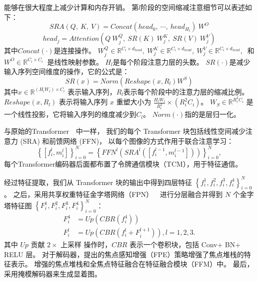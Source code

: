 能够在很大程度上减少计算和内存开销。
第$l$阶段的空间缩减注意细节可以表述如下：
%
%
%
%
\begin{equation}
	SRA(Q,~K,~V) = Concat(head_{0},~ \cdots,~ head_{H_{l}})~W^{O}
\end{equation}
%
%
\begin{equation}
	head_{j} = Attention(Q~W_{j}^{Q}, ~ SR(K)~W_{j}^{K},~ SR(V)~W_{j}^{V})
\end{equation}
%
%
%
其中$Concat(\cdot)$是连接操作。
$W_{j}^{Q} \in \mathbb{R}^{C_{i} \times d_{head}},~
W_{j}^{K} \in \mathbb{R}^{C_{i} \times d_{head}},~
W_{j}^{V} \in \mathbb{R}^{C_{i} \times d_{head}},~$
和
$W^{O} \in \mathbb{R}^{C_{i} \times C_{i}}~$
是线性映射参数。
$H_{l}$是每个阶段注意力层的头数。
$SR(\cdot)$是减少输入序列空间维度的操作，它的公式是：
%
%
%
\begin{equation}
	SR(x) = Norm(Reshape(x, R_{l})W^{S})
\end{equation}
%
%
其中$x \in \mathbb{R}^{(H_{l}W_{l}) \times C_{l}} $
表示输入序列，$R_{l}$表示每个阶段中的注意力层的缩减比例。
$Reshape(x, R_{l})$ 表示将输入序列 $x$ 重塑大小为
$\frac{H_{l}W_{l}}{R_{i}^{2}} \times (R_{i}^{2}C_{i})$。
$W_{S} \in \mathbb{R}^{R_{i}^{2}C_{i}}$
是一个线性投影，它将输入序列的维度减少到$C_{l}$。
$Norm(\cdot)$指的是层归一化。
%
%
\par
%
%
与原始的Transformer~\cite{vaswani2017attention}~中一样，
我们的每个 Transformer 块包括线性空间减少注意力 (SRA) 和前馈网络 (FFN)，
以每个图像的方式作用于联合注意学习：
\begin{equation}
	\left \{ [f_{i}^{l}, m_{i}^{l}]\right \}_{i=0}^{N} = \left \{ FFN^{l} \left  ( SRA^{l} \left ( [f_{i}^{l-1}, m_{i}^{l-1}]\right )\right )\right \}_{i=0}^{N},
\end{equation}
每个Transformer编码器后面都布置了令牌通信模块（TCM），用于特征通信。 
%
%
%
%
%
%
%
%
%
%
%
%
%
%
\par
经过特征提取，我们从 Transformer 块的输出中得到四层特征 
$\left \{ f_{i}^{1},f_{i}^{2},f_{i}^{3},f_{i}^{4} \right \}_{i=0}^{N}$ 。 
之后，采用共享权重特征金字塔网络（FPN）~\cite{lin2017feature}~进行分层融合并得到 $N$ 个金字塔特征图	$ \left \{F_{i}^{1},F_{i}^{2},F_{i}^{3},F_{i}^{4} \right \}_{i=0}^{N}$：
\begin{equation}
	\begin{aligned}
		F_{i}^{4} &= Up \left ( CBR \left ( f_{i}^{4} \right )\right ) \\ 
		F_{i}^{l} &= Up \left ( CBR \left ( f_{i}^{l} + F_{i}^{l+1} \right )  \right ),l=1,2,3  .
	\end{aligned}
\end{equation}
其中 $Up$ 贡献 $2 \times $ 上采样 操作时，$CBR$ 表示一个卷积块，包括 Conv+ BN+ RELU 层。 对于解码器，提出的焦点感知增强（FPE）策略增强了焦点堆栈的特征表示。 增强的焦点堆栈和全焦点特征融合在特征融合模块（FFM）中。 最后，采用掩模解码器来生成显着图。


















